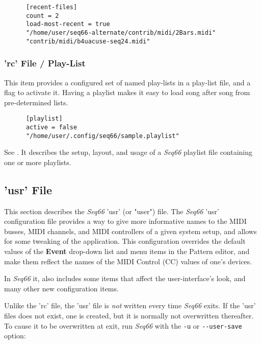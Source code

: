    \begin{verbatim}
      [recent-files]
      count = 2
      load-most-recent = true
      "/home/user/seq66-alternate/contrib/midi/2Bars.midi"
      "contrib/midi/b4uacuse-seq24.midi"
   \end{verbatim}

\subsubsection{'rc' File / Play-List}
\label{subsubsec:configuration_rc_playlist}

   This item provides a configured set of named play-lists in a play-list file,
   and a flag to activate it.
   Having a playlist makes it easy to load song after song from pre-determined
   lists.
   
   \index{[playlist]}
   \begin{verbatim}
      [playlist]
      active = false
      "/home/user/.config/seq66/sample.playlist"
   \end{verbatim}

   See .
   It describes the setup, layout, and usage of a
   \textsl{Seq66} playlist file containing one or more playlists.

\subsection{'usr' File}
\label{subsec:configuration_usr}

   This section describes the \textsl{Seq66} 'usr' (or "user") file.
   The \textsl{Seq66} 'usr'
   configuration file provides a way to give more
   informative names to the MIDI busses, MIDI channels, and MIDI controllers of
   a given system setup, and allows for some tweaking of the application.
   This configuration overrides the default values
   of the \textbf{Event} drop-down list and menu items in the Pattern editor,
   and make them reflect the names of the MIDI Control (CC) values of one's
   devices.

   In \textsl{Seq66} it, also includes some items that affect the
   user-interface's look, and many other new configuration items.

   Unlike the 'rc' file, the 'usr' file is \textsl{not} written every time
   \textsl{Seq66} exits.  If the 'usr' files does not exist, one is
   created, but it is normally not overwritten thereafter.  To
   cause it to be overwritten at exit, run \textsl{Seq66} with the
   \texttt{-u} or \texttt{-{}-user-save} option:


